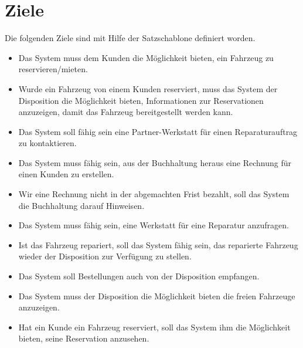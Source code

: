 \section{Ziele}
Die folgenden Ziele sind mit Hilfe der Satzschablone definiert worden.
\begin{itemize}
\item Das System muss dem Kunden die Möglichkeit bieten, ein Fahrzeug zu reservieren/mieten.
%
\item Wurde ein Fahrzeug von einem Kunden reserviert, muss das System der Disposition die Möglichkeit bieten, Informationen zur Reservationen anzuzeigen, damit das Fahrzeug bereitgestellt werden kann.
%
\item Das System soll fähig sein eine Partner-Werkstatt für einen Reparaturauftrag zu kontaktieren.
%
\item Das System muss fähig sein, aus der Buchhaltung heraus eine Rechnung für einen Kunden zu erstellen.
%
\item Wir eine Rechnung nicht in der abgemachten Frist bezahlt, soll das System die Buchhaltung darauf Hinweisen. 
%
\item Das System muss fähig sein, eine Werkstatt für eine Reparatur anzufragen.
%
\item Ist das Fahrzeug repariert, soll das System fähig sein, das reparierte Fahrzeug wieder der Disposition zur Verfügung  zu stellen.
%
\item Das System soll Bestellungen auch von der Disposition empfangen.
%
\item Das System muss der Disposition die Möglichkeit bieten die freien Fahrzeuge anzuzeigen.
%
\item Hat ein Kunde ein Fahrzeug reserviert, soll das System ihm die Möglichkeit bieten, seine Reservation anzusehen.
\end{itemize}
\newpage
